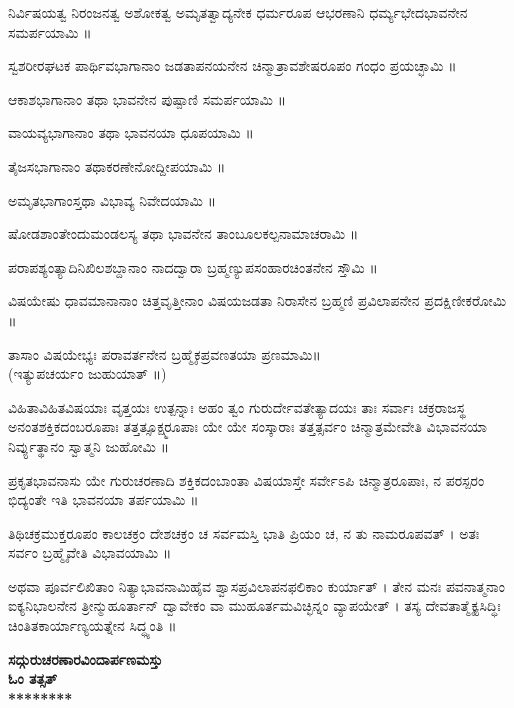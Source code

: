 ನಿರ್ವಿಷಯತ್ವ ನಿರಂಜನತ್ವ ಅಶೋಕತ್ವ ಅಮೃತತ್ವಾದ್ಯನೇಕ ಧರ್ಮರೂಪ ಆಭರಣಾನಿ ಧರ್ಮ್ಯಭೇದಭಾವನೇನ ಸಮರ್ಪಯಾಮಿ ॥

ಸ್ವಶರೀರಘಟಕ ಪಾರ್ಥಿವಭಾಗಾನಾಂ ಜಡತಾಪನಯನೇನ ಚಿನ್ಮಾತ್ರಾವಶೇಷರೂಪಂ ಗಂಧಂ ಪ್ರಯಚ್ಛಾಮಿ ॥

ಆಕಾಶಭಾಗಾನಾಂ ತಥಾ ಭಾವನೇನ ಪುಷ್ಪಾಣಿ ಸಮರ್ಪಯಾಮಿ ॥

ವಾಯವ್ಯಭಾಗಾನಾಂ ತಥಾ ಭಾವನಯಾ ಧೂಪಯಾಮಿ ॥

ತೈಜಸಭಾಗಾನಾಂ ತಥಾಕರಣೇನೋದ್ದೀಪಯಾಮಿ ॥

ಅಮೃತಭಾಗಾಂಸ್ತಥಾ ವಿಭಾವ್ಯ ನಿವೇದಯಾಮಿ ॥

ಷೋಡಶಾಂತೇಂದುಮಂಡಲಸ್ಯ ತಥಾ ಭಾವನೇನ ತಾಂಬೂಲಕಲ್ಪನಾಮಾಚರಾಮಿ ॥

ಪರಾಪಶ್ಯಂತ್ಯಾದಿನಿಖಿಲಶಬ್ದಾನಾಂ ನಾದದ್ವಾರಾ ಬ್ರಹ್ಮಣ್ಯುಪಸಂಹಾರಚಿಂತನೇನ ಸ್ತೌಮಿ ॥

ವಿಷಯೇಷು ಧಾವಮಾನಾನಾಂ ಚಿತ್ತವೃತ್ತೀನಾಂ ವಿಷಯಜಡತಾ ನಿರಾಸೇನ ಬ್ರಹ್ಮಣಿ ಪ್ರವಿಲಾಪನೇನ ಪ್ರದಕ್ಷಿಣೀಕರೋಮಿ ॥

ತಾಸಾಂ ವಿಷಯೇಭ್ಯಃ ಪರಾವರ್ತನೇನ ಬ್ರಹ್ಮೈಕಪ್ರವಣತಯಾ ಪ್ರಣಮಾಮಿ॥\\(ಇತ್ಯುಪಚರ್ಯಂ ಜುಹುಯಾತ್ ॥)

ವಿಹಿತಾವಿಹಿತವಿಷಯಾಃ ವೃತ್ತಯಃ ಉತ್ಪನ್ನಾಃ ಅಹಂ ತ್ವಂ ಗುರುರ್ದೇವತೇತ್ಯಾದಯಃ ತಾಃ ಸರ್ವಾಃ ಚಕ್ರರಾಜಸ್ಥ ಅನಂತಶಕ್ತಿಕದಂಬರೂಪಾಃ ತತ್ತತ್ಸೂಕ್ಷ್ಮರೂಪಾಃ ಯೇ ಯೇ ಸಂಸ್ಕಾರಾಃ ತತ್ತತ್ಸರ್ವಂ ಚಿನ್ಮಾತ್ರಮೇವೇತಿ ವಿಭಾವನಯಾ  ನಿರ್ವ್ಯುತ್ಥಾನಂ ಸ್ವಾತ್ಮನಿ ಜುಹೋಮಿ ॥

ಪ್ರಕೃತಭಾವನಾಸು ಯೇ ಗುರುಚರಣಾದಿ ಶಕ್ತಿಕದಂಬಾಂತಾ ವಿಷಯಾಸ್ತೇ ಸರ್ವೇಽಪಿ ಚಿನ್ಮಾತ್ರರೂಪಾಃ, ನ ಪರಸ್ಪರಂ ಭಿದ್ಯಂತೇ ಇತಿ ಭಾವನಯಾ ತರ್ಪಯಾಮಿ ॥

ತಿಥಿಚಕ್ರಮುಕ್ತರೂಪಂ ಕಾಲಚಕ್ರಂ ದೇಶಚಕ್ರಂ ಚ ಸರ್ವಮಸ್ತಿ ಭಾತಿ ಪ್ರಿಯಂ ಚ, ನ ತು ನಾಮರೂಪವತ್ । ಅತಃ ಸರ್ವಂ ಬ್ರಹ್ಮೈವೇತಿ ವಿಭಾವಯಾಮಿ ॥

ಅಥವಾ ಪೂರ್ವಲಿಖಿತಾಂ ನಿತ್ಯಾಭಾವನಾಮಿಹೈವ ಶ್ವಾಸಪ್ರವಿಲಾಪನಫಲಿಕಾಂ ಕುರ್ಯಾತ್ । ತೇನ ಮನಃ ಪವನಾತ್ಮನಾಂ ಐಕ್ಯನಿಭಾಲನೇನ ತ್ರೀನ್ಮುಹೂರ್ತಾನ್ ದ್ವಾವೇಕಂ ವಾ ಮುಹೂರ್ತಮವಿಚ್ಛಿನ್ನಂ ವ್ಯಾಪಯೇತ್ । ತಸ್ಯ ದೇವತಾತ್ಮೈಕ್ಯಸಿದ್ಧಿಃ ಚಿಂತಿತಕಾರ್ಯಾಣ್ಯಯತ್ನೇನ ಸಿದ್ಧ್ಯಂತಿ ॥
\begin{center}{\LARGE\bfseries ಸದ್ಗುರುಚರಣಾರವಿಂದಾರ್ಪಣಮಸ್ತು\\ಓಂ ತತ್ಸತ್\\********}\end{center}

